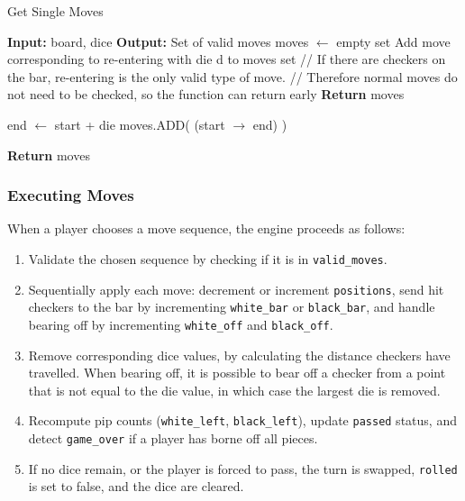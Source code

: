 \begin{algorithm}[H]
    \caption{Get Single Moves}
    \label{alg:singleMoves}
    \begin{algorithmic}
    \State \textbf{Input:} board, dice
    \State \textbf{Output:} Set of valid moves
    \State
    \State moves $\gets$ empty set 
    \State
                \State Add move corresponding to re-entering with die d to moves set
            \EndIf
        \EndFor
        \State // If there are checkers on the bar, re-entering is the only valid type of move. 
        \State // Therefore normal moves do not need to be checked, so the function can return early
        \State \textbf{Return} moves
    \EndIf
    
    \State
    \State {} 
            \State end $\gets$ start + die 
                \State moves.ADD( (start $\to$ end) ) 
            \EndIf
        \EndFor
    \EndFor

    \State \textbf{Return} moves 
    \end{algorithmic}
\end{algorithm}

\subsubsection{Executing Moves}
When a player chooses a move sequence, the engine proceeds as follows:
\begin{enumerate}
\item Validate the chosen sequence by checking if it is in \texttt{valid\_moves}.
\item Sequentially apply each move: decrement or increment \texttt{positions}, send hit checkers to the bar by incrementing \texttt{white\_bar} or \texttt{black\_bar}, and handle bearing off by incrementing \texttt{white\_off} and \texttt{black\_off}.
\item Remove corresponding dice values, by calculating the distance checkers have travelled. When bearing off, it is possible to bear off a checker from a point that is not equal to the die value, in which case the largest die is removed.
\item Recompute pip counts (\texttt{white\_left}, \texttt{black\_left}), update \texttt{passed} status, and detect \texttt{game\_over} if a player has borne off all pieces.
\item If no dice remain, or the player is forced to pass, the turn is swapped, \texttt{rolled} is set to false, and the dice are cleared.
\end{enumerate}


